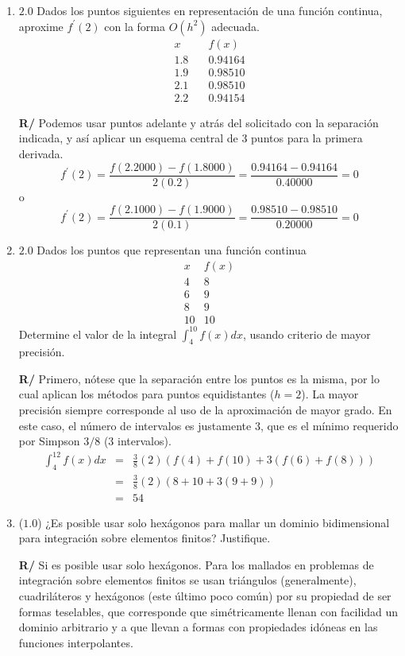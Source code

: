 \documentclass[12pt]{article}
\begin{document}
\vspace{-.5cm}
  \begin{enumerate}[leftmargin=*,widest=9]
     \item \(2.0\) Dados los puntos siguientes en representación de una función continua, aproxime \(f^\prime(2)\) con la forma \(O(h^2)\) adecuada.
     \[
     \begin{array}{lr}
     x  & f(x)\\
     1.8 \quad & 0.94164\\
     1.9 & 0.98510\\
     2.1 & 0.98510\\
     2.2 & 0.94154
     \end{array}
     \]

\textbf{R/} Podemos usar puntos adelante y atrás del solicitado con la separación indicada, y así aplicar un esquema central de 3 puntos para la primera derivada.
    \[
    f^\prime(2) = \frac{f(2.2000) - f(1.8000)}{2(0.2)} = \frac{0.94164 - 0.94164}{0.40000} = 0
    \]
    \hspace{5cm} o
    \[
    f^\prime(2) = \frac{f(2.1000) - f(1.9000)}{2(0.1)} = \frac{0.98510 - 0.98510}{0.20000} = 0
    \]
    \item \(2.0\) Dados los puntos que representan una función continua
    \[
    \begin{array}{lr}
    x & f(x)\\
    4 & 8\\
    6 & 9\\
    8 & 9\\
    10 & 10   
    \end{array}
    \]
    Determine el valor de la integral \( \int^{10}_4 f(x)dx\), usando criterio de mayor precisión.

\textbf{R/} Primero, nótese que la separación entre los puntos es la misma, por lo cual aplican los métodos para puntos equidistantes (\(h=2\)). La mayor precisión siempre corresponde al uso de la aproximación de mayor grado. En este caso, el número de intervalos es justamente 3, que es el mínimo requerido por Simpson \(3/8\) (3 intervalos).
\begin{eqnarray*}
\int^{12}_4 f(x)dx  &=& \frac{3}{8}(2)\left(f(4) + f(10) + 3 (f(6) + f(8)) \right)\\
&=&\frac{3}{8}(2)\left(8 + 10 + 3 (9 + 9) \right) \\
&=&54
\end{eqnarray*}
   \item (\(1.0\)) ¿Es posible usar solo hexágonos para mallar un dominio bidimensional para integración sobre elementos finitos? Justifique.

\textbf{R/} Si es posible usar solo hexágonos. Para los mallados en problemas de integración sobre elementos finitos se usan triángulos (generalmente), cuadriláteros y hexágonos (este último poco común) por su propiedad de ser formas teselables, que corresponde que simétricamente llenan con facilidad un dominio arbitrario y a que llevan a formas con propiedades idóneas en las funciones interpolantes.
  \end{enumerate}
\end{document}
